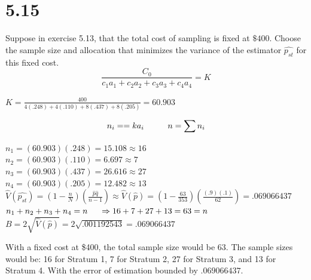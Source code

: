 \documentclass{article}
\begin{document}
\section{5.15}
Suppose in exercise 5.13, that the total cost of sampling is fixed at $\$400$. Choose the sample size and allocation that minimizes the variance of the estimator $\hat{p_{st}}$ for this fixed cost. \\
\begin{equation}
    \frac{C_0}{c_1 a_1 + c_2 a_2 + c_3 a_3 + c_4 a_4} = K
\end{equation}
\begin{center}
    $K = \frac{400}{4(.248) + 4(.110) + 8(.437) + 8(.205)} = 60.903 $
\end{center}
\begin{equation}
    n_i = = ka_i \hspace{1 cm} n = \sum n_i \\ 
\end{equation}
\begin{center}
    $n_1 = (60.903)(.248) = 15.108 \approx 16 $ \\ 
    $n_2 = (60.903)(.110) = 6.697 \approx 7 $\\
    $n_3 = (60.903)(.437) = 26.616 \approx 27 $ \\
    $n_4 = (60.903)(.205) = 12.482 \approx 13 $ \\
    \smallskip
    $\hat{V}(\hat{p_{st}}) = (1- \frac{n}{N})(\frac{\hat{p}\hat{q}}{n-1}) \approx \hat{V}(\hat{p}) = (1- \frac{63}{353})(\frac{(.9)(.1)}{62}) = .069066437 $ \\ 
    $n_1 + n_2 + n_3 + n_4 = n \hspace{.5cm} \Rightarrow 16 + 7 + 27 + 13 = 63 = n  $
    \smallskip
    $B = 2\sqrt{\hat{V}(\hat{p})} = 2\sqrt{.001192543} = .069066437 $\\
\end{center}
With a fixed cost at \$400, the total sample size would be 63. The sample sizes would be: 16 for Stratum 1, 7 for Stratum 2, 27 for Stratum 3, and 13 for Stratum 4. With the error of estimation bounded by $.069066437$. \\ 
\end{document}
